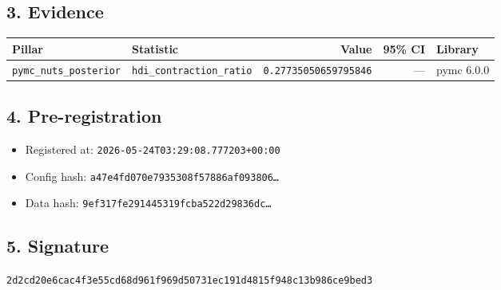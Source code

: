 \documentclass{article}
\begin{document}
\subsection*{3. Evidence}
\begin{tabular}{llrrl}\toprule
\textbf{Pillar} & \textbf{Statistic} & \textbf{Value} & \textbf{95\% CI} & \textbf{Library} \\\midrule
\texttt{pymc\_nuts\_posterior} & \texttt{hdi\_contraction\_ratio} & \texttt{0.27735050659795846} & --- & pymc 6.0.0 \\
\bottomrule\end{tabular}
\subsection*{4. Pre-registration}
\begin{itemize}
\item Registered at: \texttt{2026-05-24T03:29:08.777203+00:00}
\item Config hash: \texttt{a47e4fd070e7935308f57886af093806\dots}
\item Data hash: \texttt{9ef317fe291445319fcba522d29836dc\dots}
\end{itemize}
\subsection*{5. Signature}
\texttt{2d2cd20e6cac4f3e55cd68d961f969d50731ec191d4815f948c13b986ce9bed3}\\
\end{document}
